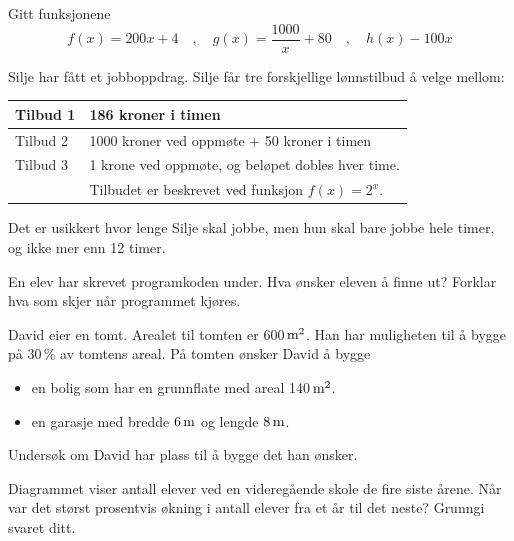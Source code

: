 Gitt funksjonene
\[ f(x)=200x+4 \quad,\quad g(x)=\frac{1000}{x}+80\quad,\quad h(x)-100x\]


Silje har fått et jobboppdrag.
Silje får tre forskjellige lønnstilbud å velge mellom:
\begin{center}
	\begin{tabular}{l| l}
		Tilbud 1 & 186 kroner i timen \\ \hline
		Tilbud 2 & 1000 kroner ved oppmøte + 50 kroner i timen \\ \hline
		Tilbud 3 &  1 krone ved oppmøte, og beløpet dobles hver time. \\
		& Tilbudet er beskrevet ved funksjon $f(x)=2^x$.
	\end{tabular}
\end{center}
Det er usikkert hvor lenge Silje skal jobbe, men hun skal bare jobbe hele timer, og ikke mer enn 12 timer.

\newpage


En elev har skrevet programkoden under.
Hva ønsker eleven å finne ut?
Forklar hva som skjer når programmet kjøres.


David eier en tomt. Arealet til tomten er 600$\,\text{m}^2$. Han har muligheten til å bygge på 30\,\% av tomtens areal.
På tomten ønsker David å bygge
\begin{itemize}
	\item en bolig som har en grunnflate med areal 140$\,\text{m}^2$.
	\item en garasje med bredde $6\,\text{m}$ og lengde $8\,\text{m}$.
\end{itemize}
Undersøk om David har plass til å bygge det han ønsker.

Diagrammet viser antall elever ved en videregående skole de fire siste årene. Når var det størst prosentvis økning i antall elever fra et år til det neste? Grunngi svaret ditt.

